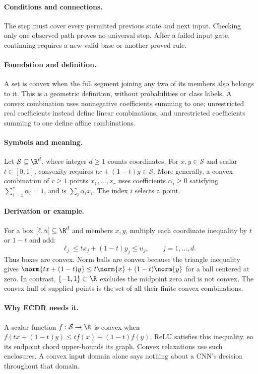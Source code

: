 \paragraph{Conditions and connections.}
The step must cover every permitted previous state and next input.
Checking only one observed path proves no universal step. After a failed
input gate, continuing requires a new valid base or another proved rule.

\paragraph{Foundation and definition.}
A set is convex when the full segment joining any two of its members
also belongs to it. This is a geometric definition, without probabilities
or class labels. A convex combination uses nonnegative coefficients
summing to one; unrestricted real coefficients instead define linear
combinations, and unrestricted coefficients summing to one define affine
combinations.
\paragraph{Symbols and meaning.}
Let $\mathcal S\subseteq\R^d$, where integer $d\ge1$ counts
coordinates. For $x,y\in\mathcal S$ and scalar $t\in[0,1]$,
convexity requires $tx+(1-t)y\in\mathcal S$. More generally, a convex
combination of $r\ge1$ points $x_1,\ldots,x_r$ uses coefficients
$\alpha_i\ge0$ satisfying $\sum_{i=1}^{r}\alpha_i=1$, and is
$\sum_i\alpha_i x_i$. The index $i$ selects a point.
\paragraph{Derivation or example.}
For a box $[\ell,u]\subseteq\R^d$ and members $x,y$, multiply each
coordinate inequality by $t$ or $1-t$ and add:
\[
 \ell_j\le tx_j+(1-t)y_j\le u_j,
 \qquad j=1,\ldots,d.
\]
Thus boxes are convex. Norm balls are convex because the triangle
inequality gives
$\norm{tx+(1-t)y}\le t\norm{x}+(1-t)\norm{y}$ for a ball centered
at zero. In contrast, $\{-1,1\}\subset\R$ excludes the midpoint
zero and is not convex. The convex hull of supplied points is the set
of all their finite convex combinations.
\paragraph{Why ECDR needs it.}
A scalar function $f:\mathcal S\to\R$ is convex when
$f(tx+(1-t)y)\le tf(x)+(1-t)f(y)$. ReLU satisfies this inequality,
so its endpoint chord upper-bounds its graph. Convex relaxations use
such enclosures. A convex input domain alone says nothing about a CNN's
decision throughout that domain.
